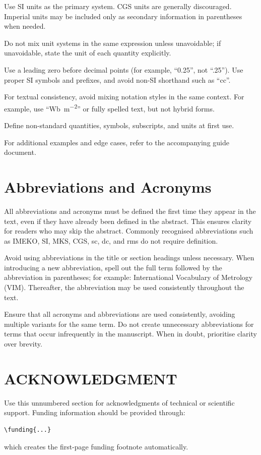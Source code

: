 \documentclass{imeko_wc}
\begin{document}
Use SI units as the primary system. CGS units are generally discouraged. Imperial units may be included only as secondary information in parentheses when needed.

Do not mix unit systems in the same expression unless unavoidable; if unavoidable, state the unit of each quantity explicitly.

Use a leading zero before decimal points (for example, ``0.25'', not ``.25''). Use proper SI symbols and prefixes, and avoid non-SI shorthand such as ``cc''.

For textual consistency, avoid mixing notation styles in the same context. For example, use ``\unit{\weber\per\square\metre}'' or fully spelled text, but not hybrid forms.

Define non-standard quantities, symbols, subscripts, and units at first use.

For additional examples and edge cases, refer to the accompanying guide document.

\section{Abbreviations and Acronyms}

All abbreviations and acronyms must be defined the first time they appear in the text, even if they have already been defined in the abstract. This ensures clarity for readers who may skip the abstract. Commonly recognised abbreviations such as IMEKO, SI, MKS, CGS, sc, dc, and rms do not require definition.

Avoid using abbreviations in the title or section headings unless necessary. When introducing a new abbreviation, spell out the full term followed by the abbreviation in parentheses; for example: International Vocabulary of Metrology (VIM). Thereafter, the abbreviation may be used consistently throughout the text.

Ensure that all acronyms and abbreviations are used consistently, avoiding multiple variants for the same term. Do not create unnecessary abbreviations for terms that occur infrequently in the manuscript. When in doubt, prioritise clarity over brevity.

\section*{ACKNOWLEDGMENT}

Use this unnumbered section for acknowledgments of technical or scientific support. Funding information should be provided through:
\begin{verbatim}
\funding{...}
\end{verbatim}
which creates the first-page funding footnote automatically.
\end{document}
